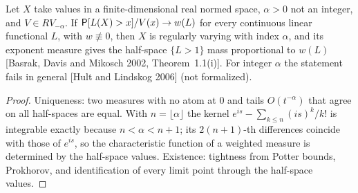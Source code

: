 \begin{theorem}
  \label{thm:cramer-wold-converse}
  \leanok
  Let $X$ take values in a finite-dimensional real normed space, $\alpha > 0$ not an integer, and $V \in RV_{-\alpha}$. If
  $\mathsf{P}[L(X) > x]/V(x) \to w(L)$ for every continuous linear functional $L$, with $w \not\equiv 0$, then $X$ is regularly varying
  with index $\alpha$, and its exponent measure gives the half-space $\{L > 1\}$ mass proportional to $w(L)$
  [Basrak, Davis and Mikosch 2002, Theorem~1.1(i)]. For integer $\alpha$ the statement fails in general [Hult and Lindskog
  2006] (not formalized).
\end{theorem}
\begin{proof}
  \leanok
  Uniqueness: two measures with no atom at $0$ and tails $O(t^{-\alpha})$ that agree on all half-spaces are equal. With
  $n = \lfloor \alpha \rfloor$ the kernel $e^{is} - \sum_{k \le n} (is)^k/k!$ is integrable exactly because $n < \alpha < n+1$; its
  $2(n+1)$-th differences coincide with those of $e^{is}$, so the characteristic function of a weighted measure is determined
  by the half-space values. Existence: tightness from Potter bounds, Prokhorov, and identification of every limit
  point through the half-space values.
\end{proof}
